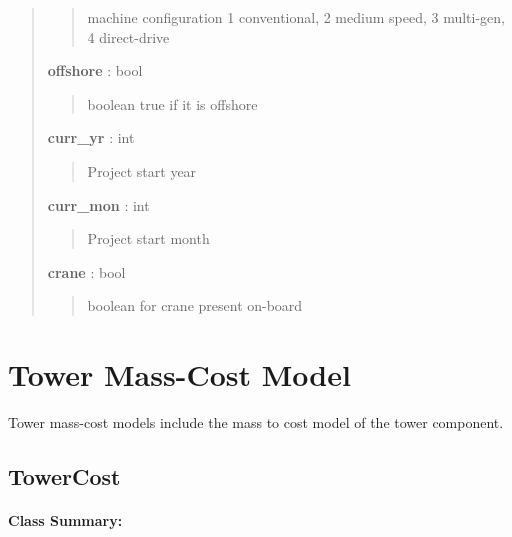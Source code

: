 \documentclass[letterpaper,10pt,openany,oneside]{sphinxmanual}
\begin{document}
\begin{fulllineitems}
\begin{quote}
\begin{description}
\begin{quote}
machine configuration 1 conventional, 2 medium speed, 3 multi-gen, 4 direct-drive
\end{quote}

\textbf{offshore} : bool
\begin{quote}

boolean true if it is offshore
\end{quote}

\textbf{curr\_yr} : int
\begin{quote}

Project start year
\end{quote}

\textbf{curr\_mon} : int
\begin{quote}

Project start month
\end{quote}

\textbf{crane} : bool
\begin{quote}

boolean for crane present on-board
\end{quote}

\end{description}\end{quote}

\end{fulllineitems}



\section{Tower Mass-Cost Model}
\label{documentation:tower-mass-cost-model}
Tower mass-cost models include the mass to cost model of the tower component.


\subsection{TowerCost}
\label{documentation:towercost}\label{documentation:towercost-class-label}\paragraph{Class Summary:}
\end{document}

